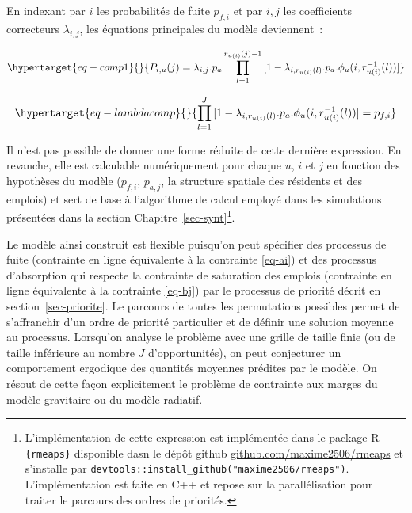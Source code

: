 \documentclass[
  10pt,
  a4paper,
  numbers=noendperiod,
  DIV=9]{scrartcl}
\begin{document}
En indexant par \(i\) les probabilités de fuite \(p_{f,i}\) et par
\(i,j\) les coefficients correcteurs \(\lambda_{i,j}\), les équations
principales du modèle deviennent~:

\begin{equation}\protect\hypertarget{eq-comp1}{}{
P_{i, u}(j) = \lambda_{i,j} . p_{a} \prod _{l=1} ^{r_{u(i)}(j)-1} {[1-\lambda_{i,r_{u(i)}(l)}. p_{a}.\phi_u(i,r_{u(i)}^{-1}(l))]}
}\label{eq-comp1}\end{equation}

\begin{equation}\protect\hypertarget{eq-lambdacomp}{}{
\prod _{l=1} ^{J} {[1-\lambda_{i,r_{u(i)}(l)}.p_{a}.\phi_u(i,r_{u(i)}^{-1}(l))]}= p_{f,i}
}\label{eq-lambdacomp}\end{equation}

Il n'est pas possible de donner une forme réduite de cette dernière
expression. En revanche, elle est calculable numériquement pour chaque
\(u\), \(i\) et \(j\) en fonction des hypothèses du modèle (\(p_{f,i}\),
\(p_{a,j}\), la structure spatiale des résidents et des emplois) et sert
de base à l'algorithme de calcul employé dans les simulations présentées
dans la section Chapitre~\ref{sec-synt}\footnote{L'implémentation de
  cette expression est implémentée dans le package R \texttt{\{rmeaps\}}
  disponible dasn le dépôt github
  \href{https://github.com/maxime2506/rmeaps}{github.com/maxime2506/rmeaps}
  et s'installe par
  \texttt{devtools::install\_github("maxime2506/rmeaps")}.
  L'implémentation est faite en C++ et repose sur la parallélisation
  pour traiter le parcours des ordres de priorités.}.

Le modèle ainsi construit est flexible puisqu'on peut spécifier des
processus de fuite (contrainte en ligne équivalente à la contrainte
\ref{eq-ai}) et des processus d'absorption qui respecte la contrainte de
saturation des emplois (contrainte en ligne équivalente à la contrainte
\ref{eq-bj}) par le processus de priorité décrit en
section~\ref{sec-priorite}. Le parcours de toutes les permutations
possibles permet de s'affranchir d'un ordre de priorité particulier et
de définir une solution moyenne au processus. Lorsqu'on analyse le
problème avec une grille de taille finie (ou de taille inférieure au
nombre \(J\) d'opportunités), on peut conjecturer un comportement
ergodique des quantités moyennes prédites par le modèle. On résout de
cette façon explicitement le problème de contrainte aux marges du modèle
gravitaire ou du modèle radiatif.

\end{document}
